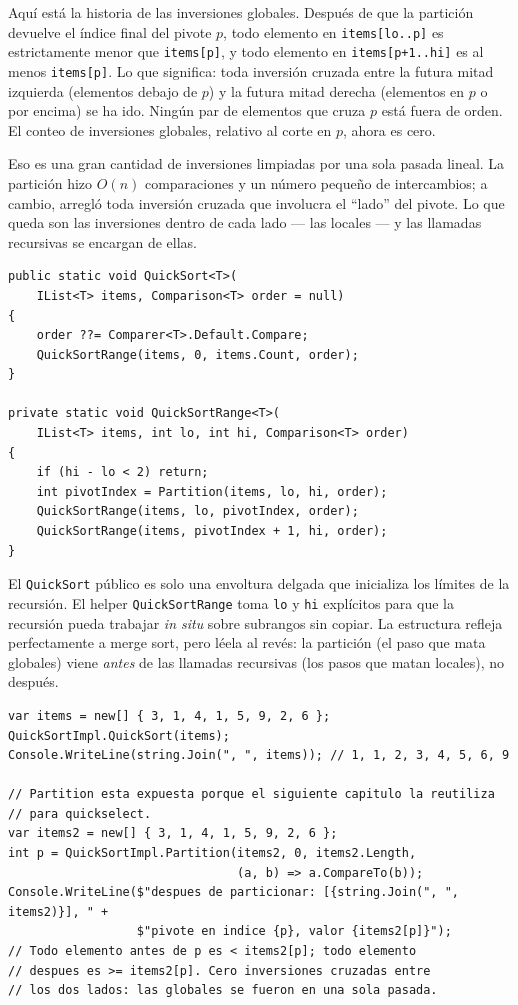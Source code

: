 \documentclass[11pt,a4paper]{article}
\begin{document}
Aquí está la historia de las inversiones globales. Después de que la partición devuelve el índice final del pivote $p$, todo elemento en \texttt{items[lo..p]} es estrictamente menor que \texttt{items[p]}, y todo elemento en \texttt{items[p+1..hi]} es al menos \texttt{items[p]}. Lo que significa: toda inversión cruzada entre la futura mitad izquierda (elementos debajo de $p$) y la futura mitad derecha (elementos en $p$ o por encima) se ha ido. Ningún par de elementos que cruza $p$ está fuera de orden. El conteo de inversiones globales, relativo al corte en $p$, ahora es cero.

Eso es una gran cantidad de inversiones limpiadas por una sola pasada lineal. La partición hizo $O(n)$ comparaciones y un número pequeño de intercambios; a cambio, arregló toda inversión cruzada que involucra el ``lado'' del pivote. Lo que queda son las inversiones dentro de cada lado --- las locales --- y las llamadas recursivas se encargan de ellas.

\begin{lstlisting}[caption={Quicksort}]
public static void QuickSort<T>(
    IList<T> items, Comparison<T> order = null)
{
    order ??= Comparer<T>.Default.Compare;
    QuickSortRange(items, 0, items.Count, order);
}

private static void QuickSortRange<T>(
    IList<T> items, int lo, int hi, Comparison<T> order)
{
    if (hi - lo < 2) return;
    int pivotIndex = Partition(items, lo, hi, order);
    QuickSortRange(items, lo, pivotIndex, order);
    QuickSortRange(items, pivotIndex + 1, hi, order);
}
\end{lstlisting}

El \texttt{QuickSort} público es solo una envoltura delgada que inicializa los límites de la recursión. El helper \texttt{QuickSortRange} toma \texttt{lo} y \texttt{hi} explícitos para que la recursión pueda trabajar \emph{in situ} sobre subrangos sin copiar. La estructura refleja perfectamente a merge sort, pero léela al revés: la partición (el paso que mata globales) viene \emph{antes} de las llamadas recursivas (los pasos que matan locales), no después.

\begin{lstlisting}
var items = new[] { 3, 1, 4, 1, 5, 9, 2, 6 };
QuickSortImpl.QuickSort(items);
Console.WriteLine(string.Join(", ", items)); // 1, 1, 2, 3, 4, 5, 6, 9

// Partition esta expuesta porque el siguiente capitulo la reutiliza
// para quickselect.
var items2 = new[] { 3, 1, 4, 1, 5, 9, 2, 6 };
int p = QuickSortImpl.Partition(items2, 0, items2.Length,
                                (a, b) => a.CompareTo(b));
Console.WriteLine($"despues de particionar: [{string.Join(", ", items2)}], " +
                  $"pivote en indice {p}, valor {items2[p]}");
// Todo elemento antes de p es < items2[p]; todo elemento
// despues es >= items2[p]. Cero inversiones cruzadas entre
// los dos lados: las globales se fueron en una sola pasada.
\end{lstlisting}
\end{document}

